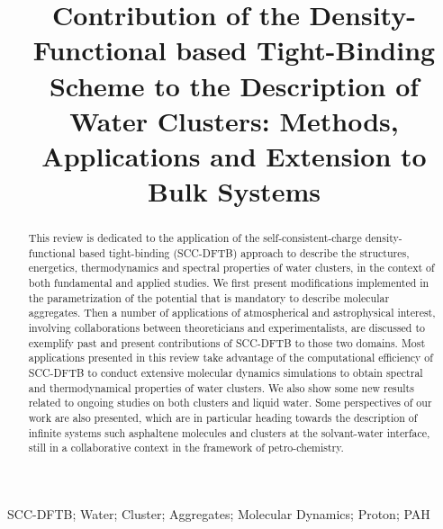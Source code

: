 \documentclass[]{interact}
\theoremstyle{plain}%
\theoremstyle{definition}
\theoremstyle{remark}
\begin{document}
\title{Contribution of the Density-Functional based Tight-Binding Scheme to the Description of Water Clusters: Methods, Applications and
Extension to Bulk Systems}

\author{
}

\maketitle

\begin{abstract}
This review is dedicated to the application of the self-consistent-charge density-functional based tight-binding (SCC-DFTB)
approach to describe the structures, energetics, thermodynamics and spectral properties of water clusters, in the context of both fundamental and applied studies.
We first present modifications implemented in the parametrization of the potential that is
mandatory to describe molecular aggregates. Then a number of applications of atmospherical and astrophysical interest, involving
collaborations between theoreticians and experimentalists, are discussed to exemplify past and present contributions of SCC-DFTB to
those two domains. Most applications presented in this review take advantage of the computational efficiency of SCC-DFTB to
conduct extensive molecular dynamics simulations to obtain spectral and thermodynamical properties of water clusters.  We also show some new results related to ongoing studies on both clusters and liquid water. Some perspectives of our work are also presented, which are in particular heading towards the description of infinite systems such asphaltene molecules and clusters at the solvant-water interface, still in a collaborative context in the framework of petro-chemistry.
\end{abstract}

\begin{keywords}
SCC-DFTB; Water; Cluster; Aggregates; Molecular Dynamics; Proton; PAH
\end{keywords}
\end{document}
